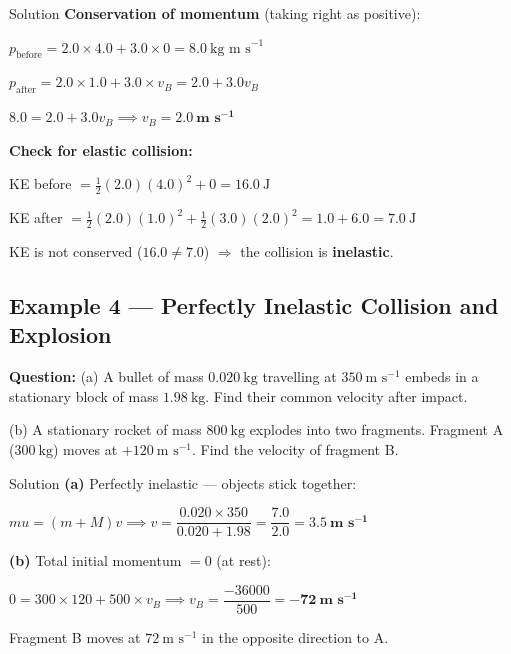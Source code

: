 \begin{examplebox}{Solution}
\textbf{Conservation of momentum} (taking right as positive):

$p_{\text{before}} = 2.0\times4.0 + 3.0\times0 = 8.0\ \text{kg m s}^{-1}$

$p_{\text{after}} = 2.0\times1.0 + 3.0\times v_B = 2.0 + 3.0v_B$

$8.0 = 2.0 + 3.0v_B \implies v_B = \mathbf{2.0\ \text{m s}^{-1}}$

\textbf{Check for elastic collision:}

KE before $= \tfrac{1}{2}(2.0)(4.0)^2 + 0 = 16.0\ \text{J}$

KE after $= \tfrac{1}{2}(2.0)(1.0)^2 + \tfrac{1}{2}(3.0)(2.0)^2 = 1.0 + 6.0 = 7.0\ \text{J}$

KE is not conserved ($16.0 \neq 7.0$) $\Rightarrow$ the collision is \textbf{inelastic}.
\end{examplebox}


\pagebreak

\subsection*{Example 4 --- Perfectly Inelastic Collision and Explosion}

\textbf{Question:} (a) A bullet of mass $0.020\ \text{kg}$ travelling at $350\ \text{m s}^{-1}$ embeds in a stationary block of mass $1.98\ \text{kg}$. Find their common velocity after impact.

(b) A stationary rocket of mass $800\ \text{kg}$ explodes into two fragments. Fragment A ($300\ \text{kg}$) moves at $+120\ \text{m s}^{-1}$. Find the velocity of fragment B.

\begin{examplebox}{Solution}
\textbf{(a)} Perfectly inelastic — objects stick together:

$mu = (m + M)v \implies v = \dfrac{0.020\times350}{0.020 + 1.98} = \dfrac{7.0}{2.0} = \mathbf{3.5\ \text{m s}^{-1}}$

\vspace{0.3em}
\textbf{(b)} Total initial momentum $= 0$ (at rest):

$0 = 300\times120 + 500\times v_B \implies v_B = \dfrac{-36000}{500} = \mathbf{-72\ \text{m s}^{-1}}$

Fragment B moves at $72\ \text{m s}^{-1}$ in the opposite direction to A.
\end{examplebox}

\pagebreak


